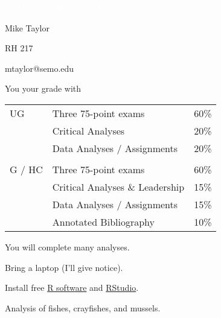 \documentclass[t]{beamer}
\begin{document}


{
\begin{frame}[b,plain]{\textcolor{white}{BI 438 / 638: Biogeography}}

\end{frame}
}

{
\begin{frame}[t,plain]
\large
\vspace{5ex}
\hangpara\hspace{17em} Mike Taylor

\hangpara\hspace{17em} RH 217

\hangpara\hspace{17em} mtaylor@semo.edu

\end{frame}
}

\begin{frame}[t]{You  your grade with}
	\begin{center}\large\begin{tabular}{@{}lll@{}}
	UG		&	Three 75-point exams 				& 	60\% \\
			&	Critical Analyses					& 	20\% \\
			&	Data Analyses / Assignments			& 	20\% \\
			&										&	\\
	G / HC	&	Three 75-point exams 				& 	60\% \\
			&	Critical Analyses \& Leadership		& 	15\% \\
			&	Data Analyses / Assignments 		&	15\% \\
			&	Annotated Bibliography 				&	10\% \\
		\end{tabular}
	\end{center}
\end{frame}

{
\begin{frame}[t,plain]{You will complete many analyses.}

	\hangpara Bring a laptop (I'll give notice).
	
	\hangpara Install free \href{https://www.r-project.org/}{R software} and \href{https://www.rstudio.com/products/rstudio/}{RStudio}.
	
	\hangpara Analysis of fishes, crayfishes, and mussels.

\end{frame}
}
\end{document}
